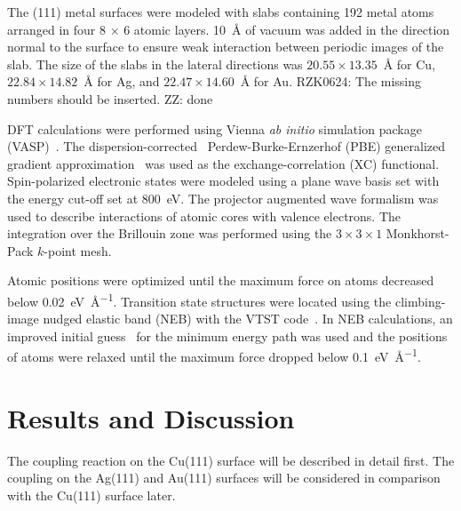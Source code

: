 \documentclass[%
 reprint,
 amsmath,amssymb,
 aps,
prb,
floatfix,
]{revtex4-2}
\newcommand{\lock}{\color{red}}
\newcommand{\zhzh}{\color{blue}}
\newcommand{\lock}{\color{black}}
\newcommand{\zhzh}{\color{blue}}
\newcommand{\comm}{\color{ForestGreen}} %
\begin{document}
{\lock

The (111) metal surfaces were modeled with slabs containing 192 metal atoms arranged in four 8 $\times$ 6 atomic layers. \SI{10}{\angstrom} of vacuum was added in the direction normal to the surface to ensure weak interaction between periodic images of the slab. The size of the slabs in the lateral directions was $20.55 \times 13.35$~\si{\angstrom} for Cu, $22.84 \times 14.82$~\si{\angstrom} for Ag, and $22.47 \times 14.60$~\si{\angstrom} for Au. 
{\comm RZK0624: The missing numbers should be inserted.}
{\zhzh ZZ: done}

DFT calculations were performed using Vienna \emph{ab initio} simulation package (VASP)~\cite{ullmann_131, ullmann_132, ullmann_133, ullmann_134}. The dispersion-corrected~\cite{ullmann_136, ullmann_137} Perdew-Burke-Ernzerhof (PBE) generalized gradient approximation~\cite{ullmann_139} was used as the exchange-correlation (XC) functional. 
Spin-polarized electronic states were modeled using a plane wave basis set with the energy cut-off set at \SI{800}{\electronvolt}.
The projector augmented wave formalism was used to describe interactions of atomic cores with valence electrons. The integration over the Brillouin zone was performed using the $3\times 3 \times1$ Monkhorst-Pack $k$-point mesh. 

Atomic positions were optimized until the maximum force on atoms decreased below \SI{0.02}{\electronvolt\per\angstrom}. 
Transition state structures were located using the climbing-image nudged elastic band (NEB) with the VTST code~\cite{ullmann_59}. 
In NEB calculations, an improved initial guess~\cite{ullmann_60, ullmann_99} for the minimum energy path was used and the positions of atoms were relaxed until the maximum force dropped below \SI{0.1}{\electronvolt\per\angstrom}.

}

\section{Results and Discussion}

The coupling reaction on the Cu(111) surface will be described in detail first. The coupling on the Ag(111) and Au(111) surfaces will be considered in comparison with the Cu(111) surface later.
\end{document}

